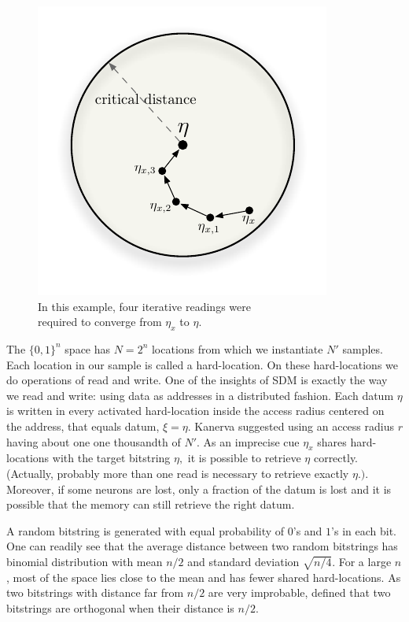 \begin{figure}[h]
\centering\includegraphics[scale=0.75]{./images02/p1_p2_iter_read.pdf}

\caption{In this example, four iterative readings were\protect \\
required to converge from $\eta_{x}$ to $\eta$.\label{fig-p1-p2-iterative-read}}
\end{figure}


The $\{0,1\}^{n}$ space has $N=2^{n}$ locations from which we instantiate $N'$ samples. Each location in our sample is called a hard-location.  On these hard-locations we do operations of read and write. One of the insights of SDM is exactly the way we read and write: using data as addresses in a distributed fashion. Each datum $\eta$ is written in every activated hard-location inside the access radius centered on the address, that equals datum, $\xi=\eta$. Kanerva suggested using an access radius $r$ having about one one thousandth of $N'$.  As an imprecise cue $\eta_{x}$ shares hard-locations with the target bitstring $\eta,$ it is possible to retrieve $\eta$ correctly. (Actually, probably more than one read is necessary to retrieve exactly $\eta.)$.  Moreover, if some neurons are lost, only a fraction of the datum is lost and it is possible that the memory can still retrieve the right datum.

A random bitstring is generated with equal probability of $0$'s and $1$'s in each bit. One can readily see that the average distance between two random bitstrings has binomial distribution with mean $n/2$ and standard deviation $\sqrt{n/4}$. For a large $n$, most of the space lies close to the mean and has fewer shared hard-locations.  As two bitstrings with distance far from $n/2$ are very improbable, \citet{Kanerva1988} defined that two bitstrings are orthogonal when their distance is $n/2$.

